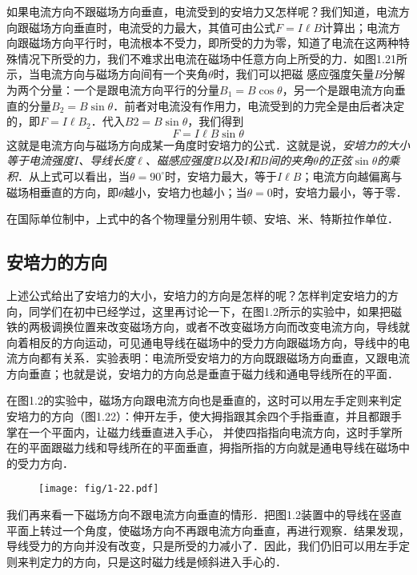 如果电流方向不跟磁场方向垂直，电流受到的安培力又怎样呢？我们知道，电流方向跟磁场方向垂直时，电流受的力最大，其值可由公式$F=I\ell B$计算出；电流方向跟磁场方向平行时，电流根本不受力，即所受的力为零，知道了电流在这两种特殊情况下所受的力，我们不难求出电流在磁场中任意方向上所受的力．如图1.21所示，当电流方向与磁场方向间有一个夹角$\theta$时，我们可以把磁
感应强度矢量$B$分解为两个分量：一个是跟电流方向平行的分量$B_1=B\cos\theta$，另一个是跟电流方向垂直的分量$B_2=B\sin\theta$．前者对电流没有作用力，电流受到的力完全是由后者决定的，即$F=I\ell B_2$．代入$B2=B\sin\theta$，我们得到
\[F=I\ell B\sin\theta\]
这就是电流方向与磁场方向成某一角度时安培力的公式．这就是说，\textit{安培力的大小等于电流强度$I$、导线长度$\ell$、磁感应强度$B$以及$I$和$B$间的夹角$\theta$的正弦$\sin\theta$的乘积}．从上式可以看出，当$\theta =90^{\circ}$时，安培力最大，等于$I\ell B$；电流方向越偏离与磁场相垂直的方向，即$\theta$越小，安培力也越小；当$\theta =0$时，安培力最小，等于零．

在国际单位制中，上式中的各个物理量分别用牛顿、安培、米、特斯拉作单位．

\subsection{安培力的方向}


上述公式给出了安培力的大小，安培力的方向是怎样的呢？怎样判定安培力的方向，同学们在初中已经学过，这里再讨论一下，在图1.2所示的实验中，如果把磁铁的两极调换位置来改变磁场方向，或者不改变磁场方向而改变电流方向，导线就向着相反的方向运动，可见通电导线在磁场中的受力方向跟磁场方向，导线中的电流方向都有关系．实验表明：电流所受安培力的方向既跟磁场方向垂直，又跟电流方向垂直；也就是说，安培力的方向总是垂直于磁力线和通电导线所在的平面．

在图1.2的实验中，磁场方向跟电流方向也是垂直的，这时可以用左手定则来判定安培力的方向（图1.22）：伸开左手，使大拇指跟其余四个手指垂直，并且都跟手掌在一个平面内，让磁力线垂直进入手心，
并使四指指向电流方向，这时手掌所在的平面跟磁力线和导线所在的平面垂直，拇指所指的方向就是通电导线在磁场中的受力方向．
\begin{figure}[htp]\centering
\texttt{[image: fig/1-22.pdf]}
\caption{}
\end{figure}

我们再来看一下磁场方向不跟电流方向垂直的情形．把图1.2装置中的导线在竖直平面上转过一个角度，使磁场方向不再跟电流方向垂直，再进行观察．结果发现，导线受力的方向并没有改变，只是所受的力减小了．因此，我们仍旧可以用左手定则来判定力的方向，只是这时磁力线是倾斜进入手心的．

